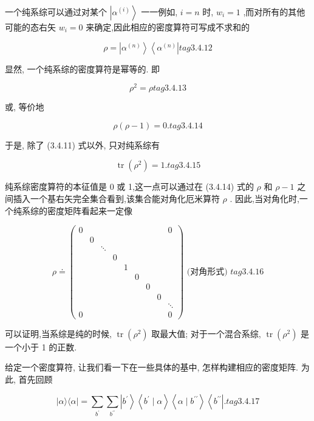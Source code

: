 一个纯系综可以通过对某个 $\left| {\alpha }^{\left( i\right) }\right\rangle$ 一一例如, $i = n$ 时, ${w}_{i} = 1$ ,而对所有的其他可能的态右矢 ${w}_{i} = 0$ 来确定,因此相应的密度算符可写成不求和的

$$
\rho = \left| {\alpha }^{\left( n\right) }\right\rangle \left\langle {\alpha }^{\left( n\right) }\right| tag{3. 4.12}
$$

显然, 一个纯系综的密度算符是幂等的. 即

$$
{\rho }^{2} = \rho tag{3. 4.13}
$$

或, 等价地

$$
\rho \left( {\rho - 1}\right) = 0. tag{3. 4.14}
$$

于是, 除了 (3.4.11) 式以外, 只对纯系综有

$$
\operatorname{tr}\left( {\rho }^{2}\right) = 1\text{.} tag{3. 4.15}
$$

纯系综密度算符的本征值是 0 或 1,这一点可以通过在 (3.4.14) 式的 $\rho$ 和 $\rho - 1$ 之间插入一个基右矢完全集合看到,该集合能对角化厄米算符 $\rho$ . 因此,当对角化时,一个纯系综的密度矩阵看起来一定像

$$
\rho \doteq \left( \begin{matrix} 0 & & & & & & & & 0 \\ & 0 & & & & & & & \\ & & \ddots & & & & & & \\ & & & 0 & & & & & \\ & & & & 1 & & & & \\ & & & & & 0 & & & \\ & & & & & & 0 & & \\ & & & & & & & 0 & \\ & & & & & & & & \ddots \\ 0 & & & & & & & & 0 \end{matrix}\right) \text{ (对角形式) } tag{3. 4.16}
$$

可以证明,当系综是纯的时候, $\operatorname{tr}\left( {\rho }^{2}\right)$ 取最大值; 对于一个混合系综, $\operatorname{tr}\left( {\rho }^{2}\right)$ 是一个小于 1 的正数.

给定一个密度算符, 让我们看一下在一些具体的基中, 怎样构建相应的密度矩阵. 为此, 首先回顾

$$
\left| {\alpha \rangle \langle \alpha }\right| = \mathop{\sum }\limits_{{b}^{\prime }}\mathop{\sum }\limits_{{b}^{\prime \prime }}\left| {b}^{\prime }\right\rangle \left\langle {{b}^{\prime } \mid \alpha }\right\rangle \left\langle {\alpha \mid {b}^{\prime \prime }}\right\rangle \left\langle {b}^{\prime \prime }\right| . tag{3. 4.17}
$$

